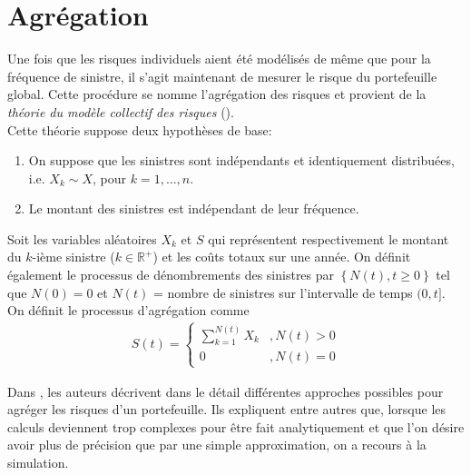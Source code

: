 \section{Agrégation}\label{Sect_Agregation}
Une fois que les risques individuels aient été modélisés de même que pour la fréquence de sinistre, il s'agit maintenant de mesurer le risque du portefeuille global. Cette procédure se nomme l'agrégation des risques et provient de la \textit{théorie du modèle collectif des risques} (\cite{CollectiveRiskTheory_kahn1962}).\\

Cette théorie suppose deux hypothèses de base:
\begin{enumerate}
	\item On suppose que les sinistres sont indépendants et identiquement distribuées, i.e. $X_k \sim X$, pour $k=1,...,n$.
	\item Le montant des sinistres est indépendant de leur fréquence. 
\end{enumerate}

	\begin{Definition}
	Soit les variables aléatoires $X_k$ et $S$ qui représentent respectivement le montant du $k$-ième sinistre ($k \in \mathbb{R}^+$) et les coûts totaux sur une année. On définit également le processus de dénombrements des sinistres par $\left\{ N(t), t \geq  0 \right\}$ tel que $N(0)=0$ et $N(t)$ = nombre de sinistres sur l'intervalle de temps $(0,t]$.\\
	
	On définit le processus d'agrégation comme
	\begin{align}
	S(t) = \left\{
	\begin{array}{ll}
	\sum_{k=1}^{N(t)} X_k & ,N(t) > 0 \\
	0 & ,N(t) = 0
	\end{array}
	\right.
	\end{align}
	\end{Definition}

	Dans \cite{albrecher2017reinsurance}, les auteurs décrivent dans le détail différentes approches possibles pour agréger les risques d'un portefeuille. Ils expliquent entre autres que, lorsque les calculs deviennent trop complexes pour être fait analytiquement et que l'on désire avoir plus de précision que par une simple approximation, on a recours à la simulation.\\
	
